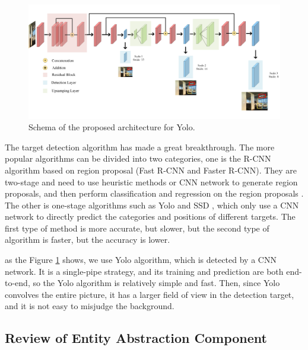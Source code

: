 \begin{figure}[h]
	\centering
	\includegraphics[scale=1]{image04.png}
	\caption{Schema of the proposed architecture for Yolo.}
	\label{image04}
\end{figure}
\vspace{-1em}
The target detection algorithm has made a great breakthrough. The more popular algorithms can be divided into two categories, one is the R-CNN algorithm based on region proposal (Fast R-CNN and Faster R-CNN). They are two-stage and need to use heuristic methods or CNN network to generate region proposals, and then perform classification and regression on the region proposals \cite{mao2019mini,girshick2015fast}. The other is one-stage algorithms such as Yolo and SSD , which only use a CNN network to directly predict the categories and positions of different targets. The first type of method is more accurate, but slower, but the second type of algorithm is faster, but the accuracy is lower.
	
as the Figure \ref{image04} shows, we use Yolo algorithm, which is detected by a CNN network. It is a single-pipe strategy, and its training and prediction are both end-to-end, so the Yolo algorithm is relatively simple and fast. Then, since Yolo convolves the entire picture, it has a larger field of view in the detection target, and it is not easy to misjudge the background.
\vspace{-1em}
\subsection{Review of Entity Abstraction Component}
	
